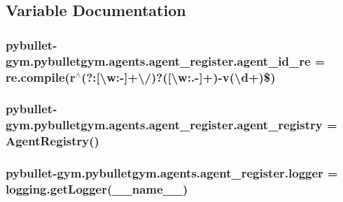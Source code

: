 \subsection{Variable Documentation}
\subsubsection[{\texorpdfstring{agent\+\_\+id\+\_\+re}{agent_id_re}}]{\setlength{\rightskip}{0pt plus 5cm}pybullet-\/gym.\+pybulletgym.\+agents.\+agent\+\_\+register.\+agent\+\_\+id\+\_\+re = re.\+compile(r\textquotesingle{}$^\wedge$(?\+:\mbox{[}\textbackslash{}w\+:-\/\mbox{]}+\textbackslash{}/)?(\mbox{[}\textbackslash{}w\+:.-\/\mbox{]}+)-\/v(\textbackslash{}d+)\$\textquotesingle{})}\hypertarget{namespacepybullet-gym_1_1pybulletgym_1_1agents_1_1agent__register_a0c7750502132dfcf1abf3feb8bc34fb6}{}\label{namespacepybullet-gym_1_1pybulletgym_1_1agents_1_1agent__register_a0c7750502132dfcf1abf3feb8bc34fb6}
\subsubsection[{\texorpdfstring{agent\+\_\+registry}{agent_registry}}]{\setlength{\rightskip}{0pt plus 5cm}pybullet-\/gym.\+pybulletgym.\+agents.\+agent\+\_\+register.\+agent\+\_\+registry = {\bf Agent\+Registry}()}\hypertarget{namespacepybullet-gym_1_1pybulletgym_1_1agents_1_1agent__register_a5bc7d879799e88c7de368e64cb5f9a53}{}\label{namespacepybullet-gym_1_1pybulletgym_1_1agents_1_1agent__register_a5bc7d879799e88c7de368e64cb5f9a53}
\subsubsection[{\texorpdfstring{logger}{logger}}]{\setlength{\rightskip}{0pt plus 5cm}pybullet-\/gym.\+pybulletgym.\+agents.\+agent\+\_\+register.\+logger = logging.\+get\+Logger(\+\_\+\+\_\+name\+\_\+\+\_\+)}\hypertarget{namespacepybullet-gym_1_1pybulletgym_1_1agents_1_1agent__register_a664deb1a16bcd19540505c606c7dac6e}{}\label{namespacepybullet-gym_1_1pybulletgym_1_1agents_1_1agent__register_a664deb1a16bcd19540505c606c7dac6e}
